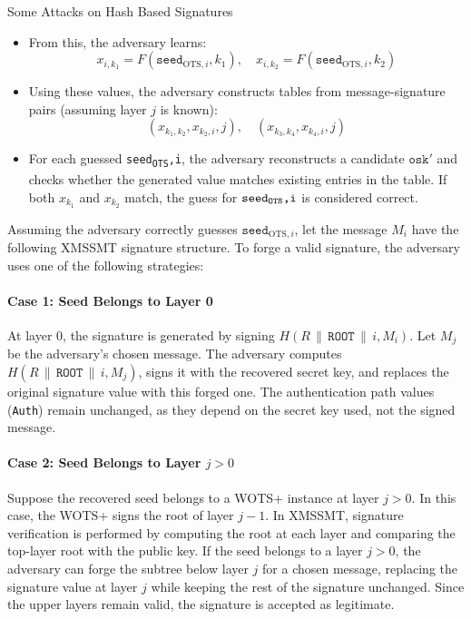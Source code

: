 \documentclass [version=submission]{iacrcc}
\begin{document}
\begin{section}{Some Attacks on Hash Based Signatures}
\begin{itemize}
    \item From this, the adversary learns:
    \[
    x_{i,k_1} = F(\texttt{seed}_{\text{OTS},i}, k_1), \quad x_{i,k_2} = F(\texttt{seed}_{\text{OTS},i}, k_2)
    \]
    
    \item Using these values, the adversary constructs tables from message-signature pairs (assuming layer $j$ is known):
    \[
    (x_{k_1,k_2}, x_{k_2,i}, j), \quad (x_{k_3,k_4}, x_{k_4,i}, j)
    \]
    
    \item For each guessed \texttt{seed\textsubscript{OTS},i}, the adversary reconstructs a candidate $\texttt{osk}'$ and checks whether the generated value matches existing entries in the table. If both $x_{k_1}$ and $x_{k_2}$ match, the guess for $\texttt{seed\textsubscript{OTS},i}$ is considered correct.
\end{itemize}

Assuming the adversary correctly guesses $\texttt{seed}_{\text{OTS},i}$, let the message $M_i$ have the following XMSSMT signature structure. To forge a valid signature, the adversary uses one of the following strategies:

\paragraph{Case 1: Seed Belongs to Layer 0}

At layer 0, the signature is generated by signing $H(R \,\|\, \texttt{ROOT} \,\|\, i, M_i)$. Let $M_j$ be the adversary’s chosen message. The adversary computes $H(R \,\|\, \texttt{ROOT} \,\|\, i, M_j)$, signs it with the recovered secret key, and replaces the original signature value with this forged one. The authentication path values (\texttt{Auth}) remain unchanged, as they depend on the secret key used, not the signed message.

\paragraph{Case 2: Seed Belongs to Layer $j > 0$}

Suppose the recovered seed belongs to a WOTS+ instance at layer $j > 0$. In this case, the WOTS+ signs the root of layer $j-1$. In XMSSMT, signature verification is performed by computing the root at each layer and comparing the top-layer root with the public key. If the seed belongs to a layer $j > 0$, the adversary can forge the subtree below layer $j$ for a chosen message, replacing the signature value at layer $j$ while keeping the rest of the signature unchanged. Since the upper layers remain valid, the signature is accepted as legitimate.


\end{section}
\end{document}
